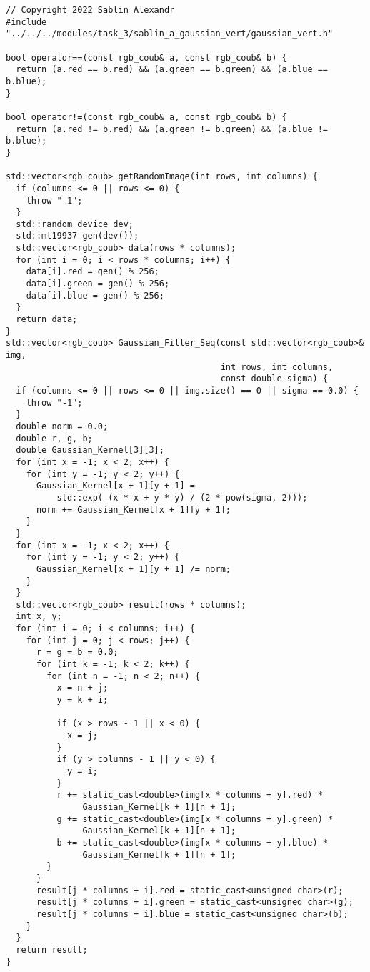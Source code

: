 \documentclass{report}
\begin{document}
\begin{lstlisting}
// Copyright 2022 Sablin Alexandr
#include "../../../modules/task_3/sablin_a_gaussian_vert/gaussian_vert.h"

bool operator==(const rgb_coub& a, const rgb_coub& b) {
  return (a.red == b.red) && (a.green == b.green) && (a.blue == b.blue);
}

bool operator!=(const rgb_coub& a, const rgb_coub& b) {
  return (a.red != b.red) && (a.green != b.green) && (a.blue != b.blue);
}

std::vector<rgb_coub> getRandomImage(int rows, int columns) {
  if (columns <= 0 || rows <= 0) {
    throw "-1";
  }
  std::random_device dev;
  std::mt19937 gen(dev());
  std::vector<rgb_coub> data(rows * columns);
  for (int i = 0; i < rows * columns; i++) {
    data[i].red = gen() % 256;
    data[i].green = gen() % 256;
    data[i].blue = gen() % 256;
  }
  return data;
}
std::vector<rgb_coub> Gaussian_Filter_Seq(const std::vector<rgb_coub>& img,
                                          int rows, int columns,
                                          const double sigma) {
  if (columns <= 0 || rows <= 0 || img.size() == 0 || sigma == 0.0) {
    throw "-1";
  }
  double norm = 0.0;
  double r, g, b;
  double Gaussian_Kernel[3][3];
  for (int x = -1; x < 2; x++) {
    for (int y = -1; y < 2; y++) {
      Gaussian_Kernel[x + 1][y + 1] =
          std::exp(-(x * x + y * y) / (2 * pow(sigma, 2)));
      norm += Gaussian_Kernel[x + 1][y + 1];
    }
  }
  for (int x = -1; x < 2; x++) {
    for (int y = -1; y < 2; y++) {
      Gaussian_Kernel[x + 1][y + 1] /= norm;
    }
  }
  std::vector<rgb_coub> result(rows * columns);
  int x, y;
  for (int i = 0; i < columns; i++) {
    for (int j = 0; j < rows; j++) {
      r = g = b = 0.0;
      for (int k = -1; k < 2; k++) {
        for (int n = -1; n < 2; n++) {
          x = n + j;
          y = k + i;

          if (x > rows - 1 || x < 0) {
            x = j;
          }
          if (y > columns - 1 || y < 0) {
            y = i;
          }
          r += static_cast<double>(img[x * columns + y].red) *
               Gaussian_Kernel[k + 1][n + 1];
          g += static_cast<double>(img[x * columns + y].green) *
               Gaussian_Kernel[k + 1][n + 1];
          b += static_cast<double>(img[x * columns + y].blue) *
               Gaussian_Kernel[k + 1][n + 1];
        }
      }
      result[j * columns + i].red = static_cast<unsigned char>(r);
      result[j * columns + i].green = static_cast<unsigned char>(g);
      result[j * columns + i].blue = static_cast<unsigned char>(b);
    }
  }
  return result;
}


\end{lstlisting}
\end{document}
